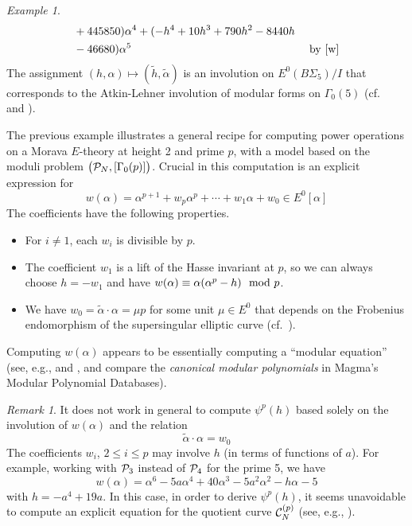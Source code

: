 \documentclass{gtpart}
\theoremstyle{definition}
\theoremstyle{remark}
\newtheorem{rmk}[thm]{Remark}
\newtheorem{ex}[thm]{Example}
\newcommand{\CC}{{\cal C}}
\newcommand{\CP}{{\cal P}}
\newcommand{\md}{~~{\rm mod}~}
\newcommand{\A}{\alpha}
\newcommand{\G}{\Gamma}
\renewcommand{\=}{\approx}
\renewcommand{\-}{\sim}
\numberwithin{equation}{section}
\numberwithin{thm}{section}
\begin{document}
\begin{ex}
\begin{equation}
\begin{split}
               & + 445850) \A^4 + (-h^4 + 10 h^3 + 790 h^2 - 8440 h \\
               & - 46680) \A^5 
                 \qquad\qquad\qquad\qquad\qquad\qquad\qquad\quad~~~ 
                 \text{by \eqref{w}} 
  \end{split}
 \end{equation}
 The assignment $(h, \A) \mapsto (\widetilde{h}, \widetilde{\A})$ is an 
 involution on $E^0(B\Sigma_5) / I$ that corresponds to the Atkin-Lehner 
 involution of modular forms on $\G_0(5)$ (cf.~\cite[Lemmas 7--10]{AtkinLehner} 
 and \cite[11.3.1]{KM}).  
\end{ex}

The previous example illustrates a general recipe for computing power operations 
on a Morava $E$-theory at height 2 and prime $p$, with a model based on the 
moduli problem $\big(\CP_N,[\G_0(p)]\big)$.  Crucial in this computation is an 
explicit expression for 
\begin{equation}
 \label{generalw}
 w(\A) = \A^{p + 1} + w_p \A^p + \cdots + w_1 \A + w_0 \in E^0[\A] 
\end{equation}
The coefficients have the following properties.  
\begin{itemize}
 \item For $i \neq 1$, each $w_i$ is divisible by $p$.  

 \item The coefficient $w_1$ is a lift of the Hasse invariant at $p$, so we can 
 always choose $h = -w_1$ and have $w(\A) \equiv \A (\A^p - h) \md p$.  

 \item We have $w_0 = \widetilde{\A} \cdot \A = \mu p$ for some unit 
 $\mu \in E^0$ that depends on the Frobenius endomorphism of the supersingular 
 elliptic curve (cf.~\cite[3.8]{mc1}).  
\end{itemize}
Computing $w(\A)$ appears to be essentially computing a ``modular equation'' 
(see, e.g., \cite[II.6]{Milne} and \cite{MO}, and compare the {\em canonical 
modular polynomials} in Magma's Modular Polynomial Databases).  

\begin{rmk}
 \label{rmk:invl}
 It does not work in general to compute $\psi^p(h)$ based solely on the 
 involution of $w(\A)$ and the relation 
 \begin{equation}
  \label{w0}
  \widetilde{\A} \cdot \A = w_0 
 \end{equation}
 The coefficients $w_i$, $2 \leq i \leq p$ may involve $h$ (in terms of 
 functions of $a$).  For example, working with $\CP_3$ instead of $\CP_4$ for 
 the prime 5, we have 
 \[
  w(\A) = \A^6 - 5 a \A^4 + 40 \A^3 - 5 a^2 \A^2 - h \A - 5 
 \]
 with $h = -a^4 + 19 a$.  In this case, in order to derive $\psi^p(h)$, it seems 
 unavoidable to compute an explicit equation for the quotient curve 
 $\CC_N^{(p)}$ (see, e.g., \cite[proof of Proposition 2.3]{p3}).  
\end{rmk}
\end{document}
